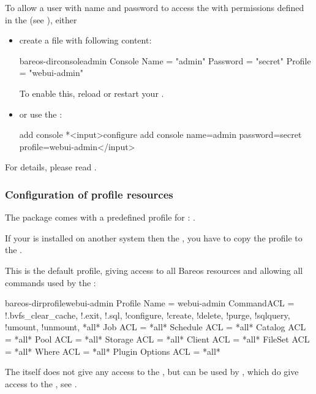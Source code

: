 To allow a user with name  and password  to access the \bareosDir
with permissions defined in the  (see ),
either
\begin{itemize}
\item create a file  with following content:
\begin{bareosConfigResource}{bareos-dir}{console}{admin}
Console {
  Name = "admin"
  Password = "secret"
  Profile = "webui-admin"
}
\end{bareosConfigResource}

To enable this, reload or restart your \bareosDir.
\item or use the :
\begin{bconsole}{add console}
*<input>configure add console name=admin password=secret profile=webui-admin</input>
\end{bconsole}
\end{itemize}


For details, please read .



\subsubsection{Configuration of profile resources}
    \label{sec:webui-profile}

The package  comes with a predefined profile for \bareosWebui: .

If your \bareosWebui is installed on another system then the \bareosDir, you have to copy the profile to the \bareosDir.

This is the default profile, giving access to all Bareos resources and allowing all commands used by the \bareosWebui:

\begin{bareosConfigResource}{bareos-dir}{profile}{webui-admin}
Profile {
  Name = webui-admin
  CommandACL = !.bvfs_clear_cache, !.exit, !.sql, !configure, !create, !delete, !purge, !sqlquery, !umount, !unmount, *all*
  Job ACL = *all*
  Schedule ACL = *all*
  Catalog ACL = *all*
  Pool ACL = *all*
  Storage ACL = *all*
  Client ACL = *all*
  FileSet ACL = *all*
  Where ACL = *all*
  Plugin Options ACL = *all*
}
\end{bareosConfigResource}

The  itself does not give any access to the \bareosDir,
but can be used by , which do give access to the \bareosDir, see .

